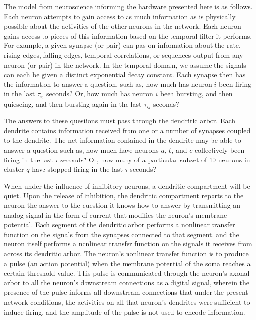 The model from neuroscience informing the hardware presented here is as follows. Each neuron attempts to gain access to as much information as is physically possible about the activities of the other neurons in the network. Each neuron gains access to pieces of this information based on the temporal filter it performs. For example, a given synapse (or pair) can pas on information about the rate, rising edges, falling edges, temporal correlations, or sequences output from any neuron (or pair) in the network. In the temporal domain, we assume the signals can each be given a distinct exponential decay constant. Each synapse then has the information to answer a question, such as, how much has neuron $i$ been firing in the last $\tau_{ij}$ seconds? Or, how much has neuron $i$ been bursting, and then quiescing, and then bursting again in the last $\tau_{ij}$ seconds? 

The answers to these questions must pass through the dendritic arbor. Each dendrite contains information received from one or a number of synapses coupled to the dendrite. The net information contained in the dendrite may be able to answer a question such as, how much have neurons $a$, $b$, and $c$ collectively been firing in the last $\tau$ seconds? Or, how many of a particular subset of 10 neurons in cluster $q$ have stopped firing in the last $\tau$ seconds? 

When under the influence of inhibitory neurons, a dendritic compartment will be quiet. Upon the release of inhibition, the dendritic compartment reports to the neuron the answer to the question it knows how to answer by transmitting an analog signal in the form of current that modifies the neuron's membrane potential. Each segment of the dendritic arbor performs a nonlinear transfer function on the signals from the synapses connected to that segment, and the neuron itself performs a nonlinear transfer function on the signals it receives from across its dendritic arbor. The neuron's nonlinear transfer function is to produce a pulse (an action potential) when the membrane potential of the soma reaches a certain threshold value. This pulse is communicated through the neuron's axonal arbor to all the neuron's downstream connections as a digital signal, wherein the presence of the pulse informs all downstream connections that under the present network conditions, the activities on all that neuron's dendrites were sufficient to induce firing, and the amplitude of the pulse is not used to encode information.

